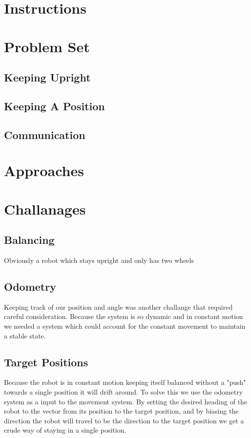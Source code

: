 \documentclass[12pt]{article}
\begin{document}
\section{Instructions}


\section{Problem Set}

\subsection{Keeping Upright}
\subsection{Keeping A Position}
\subsection{Communication}

\section{Approaches}



\section{Challanages}

\subsection{Balancing}
Obviously a robot which stays upright and only has two wheels 
\subsection{Odometry}
Keeping track of our position and angle was another challange that required careful consideration. Because the system is so dynamic and in constant motion we needed a system which could account for the constant movement to maintain a stable state.
\subsection{Target Positions}
Because the robot is in constant motion keeping itself balanced without a "push" towards a single position it will drift around. To solve this we use the odometry system as a input to the movement system. By setting the desired heading of the robot to the vector from its position to the target position, and by biasing the direction the robot will travel to be the direction to the target position we get a crude way of staying in a single position.
\end{document}
